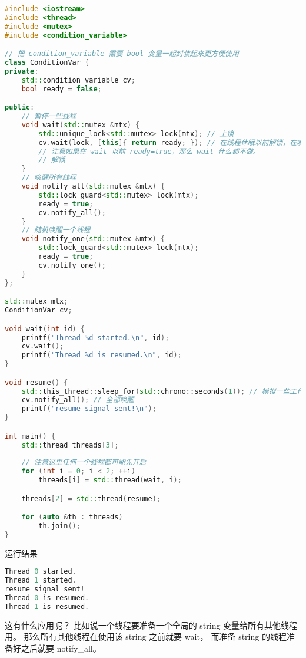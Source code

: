 \begin{lstlisting}[language=cpp]
#include <iostream>
#include <thread>
#include <mutex>
#include <condition_variable>

// 把 condition_variable 需要 bool 变量一起封装起来更方便使用
class ConditionVar {
private:
    std::condition_variable cv;
    bool ready = false;

public:
    // 暂停一些线程
    void wait(std::mutex &mtx) {
        std::unique_lock<std::mutex> lock(mtx); // 上锁
        cv.wait(lock, [this]{ return ready; }); // 在线程休眠以前解锁，在唤醒时再次上锁
        // 注意如果在 wait 以前 ready=true，那么 wait 什么都不做。
        // 解锁
    }
    // 唤醒所有线程
    void notify_all(std::mutex &mtx) {
        std::lock_guard<std::mutex> lock(mtx);
        ready = true;
        cv.notify_all();
    }
    // 随机唤醒一个线程
    void notify_one(std::mutex &mtx) {
        std::lock_guard<std::mutex> lock(mtx);
        ready = true;
        cv.notify_one();
    }
};

std::mutex mtx;
ConditionVar cv;

void wait(int id) {
	printf("Thread %d started.\n", id);
    cv.wait();
	printf("Thread %d is resumed.\n", id);
}

void resume() {
    std::this_thread::sleep_for(std::chrono::seconds(1)); // 模拟一些工作
    cv.notify_all(); // 全部唤醒
    printf("resume signal sent!\n");
}

int main() {
    std::thread threads[3];
    
    // 注意这里任何一个线程都可能先开启
    for (int i = 0; i < 2; ++i)
        threads[i] = std::thread(wait, i);

    threads[2] = std::thread(resume);

    for (auto &th : threads)
        th.join();
}
\end{lstlisting}
运行结果
\begin{lstlisting}[language=cpp]
Thread 0 started.
Thread 1 started.
resume signal sent!
Thread 0 is resumed.
Thread 1 is resumed.
\end{lstlisting}

这有什么应用呢？ 比如说一个线程要准备一个全局的 string 变量给所有其他线程用。 那么所有其他线程在使用该 string 之前就要 wait， 而准备 string 的线程准备好之后就要 notify_all。
